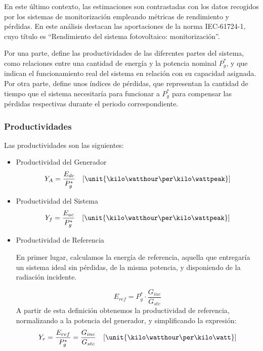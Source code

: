 En este último contexto, las estimaciones son contrastadas con los datos recogidos por los sistemas de monitorización empleando métricas de rendimiento y pérdidas. En este análisis destacan las aportaciones de la norma IEC-61724-1, cuyo título es ``Rendimiento del sistema fotovoltaico: monitorización''.

Por una parte, define las productividades de las diferentes partes del sistema, como relaciones entre una cantidad de energía y la potencia nominal $P_g^*$, y que indican el funcionamiento real del sistema en relación con su capacidad asignada. Por otra parte, define unos índices de pérdidas, que representan la cantidad de tiempo que el sistema necesitaría para funcionar a $P_g^*$ para compensar las pérdidas respectivas durante el periodo correspondiente.

\subsubsection{Productividades}

Las productividades son las siguientes:
\begin{itemize}
\item Productividad del Generador 
  \begin{equation}
    \label{eq:ya}
    Y_A = \frac{E_{dc}}{P_g^*} \quad [\unit{\kilo\watthour\per\kilo\wattpeak}]
  \end{equation}
  
\item Productividad del Sistema
  \begin{equation}
    \label{eq:yf}
    Y_f = \frac{E_{ac}}{P_g^*} \quad [\unit{\kilo\watthour\per\kilo\wattpeak}]
  \end{equation}
  
\item Productividad de Referencia

  En primer lugar, calculamos la energía de referencia, aquella que entregaría un sistema ideal sin pérdidas, de la misma potencia, y disponiendo de la radiación incidente.

  \begin{equation}
    \label{eq:Eref}
      E_{ref} = P_g^* \cdot \frac{G_{inc}}{G_{stc}}
  \end{equation}
A partir de esta definición obtenemos la productividad de referencia, normalizando a la potencia del generador, y simplificando la expresión:
  \begin{equation}
    Y_r = \frac{E_{ref}}{P_g^*} = \frac{G_{inc}}{G_{stc}} \quad [\unit{\kilo\watthour\per\kilo\watt}]
    \label{eq:yr}
  \end{equation}
\end{itemize}

